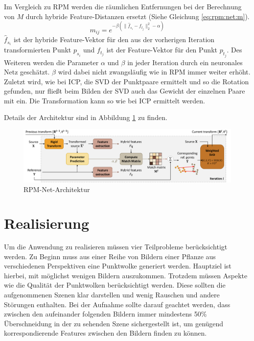 \documentclass[12pt,titlepage, twoside]{article}
\begin{document}
Im Vergleich zu RPM werden die räumlichen Entfernungen bei der Berechnung von $M$ durch hybride Feature-Distanzen ersetzt (Siehe Gleichung \ref{eq:rpm:net:m}).
\begin{equation}
    \label{eq:rpm:net:m}
    m_{ij} = e^{-\beta(\|\hat{f}_{s_i} - f_{t_j}\|_2^2-\alpha)}
\end{equation}
$\hat{f}_{s_i}$ ist der hybride Feature-Vektor für den aus der vorherigen Iteration transformierten Punkt $p_{s_i}$ und $f_{t_j}$ ist der Feature-Vektor für den Punkt $p_{t_j}$.
Des Weiteren werden die Parameter $\alpha$ und $\beta$ in jeder Iteration durch ein neuronales Netz geschätzt. 
$\beta$ wird dabei nicht zwangsläufig wie in RPM immer weiter erhöht.
Zuletzt wird, wie bei ICP, die SVD der Punktpaare ermittelt und so die Rotation gefunden, nur fließt beim Bilden der SVD auch das Gewicht der einzelnen Paare mit ein. 
Die Transformation kann so wie bei ICP ermittelt werden. 

 Details der Architektur sind in Abbildung \ref{fig:rpm:net:arch} zu finden.

\begin{figure}
    \centering
    \includegraphics[width=1.0\textwidth]{./Images/RPM_Net_Arch.png}
    \caption{RPM-Net-Architektur \cite{Yew_2020}}
    \label{fig:rpm:net:arch}
\end{figure}

\newpage
\section{Realisierung}
\label{sec:realisierung}
Um die Anwendung zu realisieren müssen vier Teilprobleme berücksichtigt werden. Zu Beginn muss aus einer Reihe von Bildern einer Pflanze aus verschiedenen Perspektiven eine Punktwolke generiert werden. 
Hauptziel ist hierbei, mit möglichst wenigen Bildern auszukommen. 
Trotzdem müssen Aspekte wie die Qualität der Punktwolken berücksichtigt werden. Diese sollten die aufgenommenen Szenen klar darstellen und wenig Rauschen und andere Störungen enthalten. 
Bei der Aufnahme sollte darauf geachtet werden, dass zwischen den aufeinander folgenden Bildern immer mindestens 50\% Überschneidung in der zu sehenden Szene sichergestellt ist, um genügend korrespondierende Features zwischen den Bildern finden zu können. 
\end{document}
